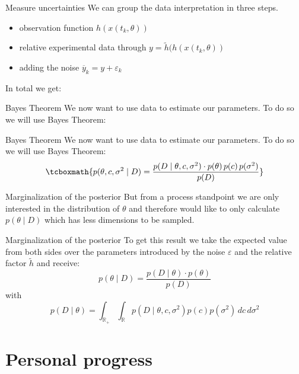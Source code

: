 \documentclass{beamer}
\newcommand{\s}{\sigma^2}
\begin{document}
  	\begin{frame}{Measure uncertainties}
    	We can group the data interpretation in three steps.
    	\begin{itemize}
    		\item observation function $h(x(t_k,\theta))$
    		\item relative experimental data through $y = \tilde{h}
    		(h(x(t_k,\theta))$
    		\item adding the noise $\overline{y}_{k} = y + \varepsilon_{k}$
    	\end{itemize}
    	In total we get:
    	\vspace{0.7cm}
  		\tcbox[colframe=red!75!black]
  		{$\overline{y}_{k} = c + (h(x(t_k,\theta)) + \varepsilon_{k}$ with $
  		\varepsilon_k \sim \mathcal{N}(0, \s)$}
  	\end{frame}
     
  	\begin{frame}{Bayes Theorem}
  		We now want to use data to estimate our parameters. To 
  		do so we will use Bayes Theorem: %
  	\end{frame}

	\begin{frame}{Bayes Theorem}
  		We now want to use data to estimate our parameters. To 
  		do so we will use Bayes Theorem:
  		\[  \tcboxmath{p(\theta,c,\s \mid D) = \frac{p(D \mid \theta,c,\s) \cdot
  		p(\theta) \, p(c) \, p(\s)}{p(D)}} \]
  	\end{frame}
  	
	\begin{frame}{Marginalization of the posterior}
  		But from a process standpoint we are only 
  		interested in the distribution of $\theta$ and therefore would like to 
  		only calculate $p(\theta \mid D)$ which has less dimensions to be sampled.
  	\end{frame}
  	
  	\begin{frame}{Marginalization of the posterior}
		To get this result we take the expected value from both sides over the 
		parameters introduced by the noise $\varepsilon$ and the relative factor 
		$\tilde{h}$ and receive:
		\[
			p(\theta \mid D) = \frac{p(D \mid \theta) \cdot p(\theta)}{p(D)}
		\]
		with 
		\[
			p(D \mid \theta) = \int_{\mathbb{R}_+} \int_{\mathbb{R}} p(D \mid 
			\theta,c,\s) p(c) p(\s) \, dc \, d\s
		\]
  	\end{frame}  
  
\section{Personal progress}
	
\end{document}
